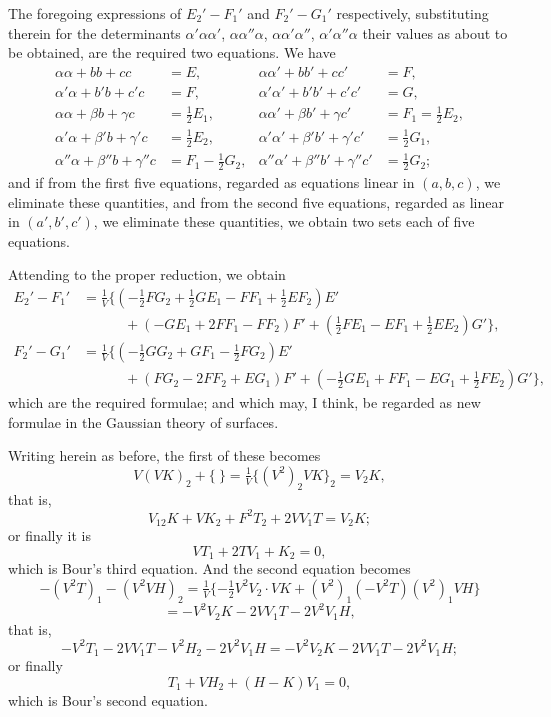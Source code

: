 \documentclass[11pt,a4paper]{article}
\theoremstyle{definition}
\begin{document}
The foregoing expressions of $E_2' - F_1'$ and $F_2' - G_1'$ respectively, substituting therein for the determinants $\alpha'\alpha\alpha'$, $\alpha\alpha''\alpha$, $\alpha\alpha'\alpha''$, $\alpha'\alpha''\alpha$ their values as about to be obtained, are the required two equations. We have
\[
\begin{aligned}
\alpha\alpha + bb + cc &= E, & \alpha\alpha' + bb' + cc' &= F,\\
\alpha'\alpha + b'b + c'c &= F, & \alpha'\alpha' + b'b' + c'c' &= G,\\
\alpha\alpha + \beta b + \gamma c &= \tfrac{1}{2}E_1, & \alpha\alpha' + \beta b' + \gamma c' &= F_1 = \tfrac{1}{2}E_2,\\
\alpha'\alpha + \beta'b + \gamma'c &= \tfrac{1}{2}E_2, & \alpha'\alpha' + \beta'b' + \gamma'c' &= \tfrac{1}{2}G_1,\\
\alpha''\alpha + \beta''b + \gamma''c &= F_1 - \tfrac{1}{2}G_2, & \alpha''\alpha' + \beta''b' + \gamma''c' &= \tfrac{1}{2}G_2;
\end{aligned}
\]
and if from the first five equations, regarded as equations linear in $(a, b, c)$, we eliminate these quantities, and from the second five equations, regarded as linear in $(a', b', c')$, we eliminate these quantities, we obtain two sets each of five equations.

Attending to the proper reduction, we obtain
\[
\begin{aligned}
E_2' - F_1' &= \tfrac{1}{V}\{(-\tfrac{1}{2}FG_2 + \tfrac{1}{2}GE_1 - FF_1 + \tfrac{1}{2}EF_2)E' \\
&\qquad\quad + (-GE_1 + 2FF_1 - FF_2)F' + (\tfrac{1}{2}FE_1 - EF_1 + \tfrac{1}{2}EE_2)G'\},\\
F_2' - G_1' &= \tfrac{1}{V}\{(-\tfrac{1}{2}GG_2 + GF_1 - \tfrac{1}{2}FG_2)E' \\
&\qquad\quad + (FG_2 - 2FF_2 + EG_1)F' + (-\tfrac{1}{2}GE_1 + FF_1 - EG_1 + \tfrac{1}{2}FE_2)G'\},
\end{aligned}
\]
which are the required formulae; and which may, I think, be regarded as new formulae in the Gaussian theory of surfaces.

Writing herein as before, the first of these becomes
\[
V(VK)_2 + \{\ \} = \tfrac{1}{V}\{(V^2)_2 VK\}_2 = V_2 K,
\]
that is,
\[
V_{12}K + VK_2 + F^2 T_2 + 2VV_1 T = V_2 K;
\]
or finally it is
\[
VT_1 + 2TV_1 + K_2 = 0,
\]
which is Bour's third equation. And the second equation becomes
\[
-(V^2 T)_1 - (V^2 VH)_2 = \tfrac{1}{V}\{-\tfrac{1}{2}V^2 V_2 \cdot VK + (V^2)_1 (-V^2T)(V^2)_1 VH\}
\]
\[
= -V^2V_2 K - 2VV_1 T - 2V^2V_1 H,
\]
that is,
\[
-V^2T_1 - 2VV_1 T - V^2H_2 - 2V^2V_1 H = -V^2V_2 K - 2VV_1 T - 2V^2V_1 H;
\]
or finally
\[
T_1 + VH_2 + (H - K)V_1 = 0,
\]
which is Bour's second equation.
\end{document}
